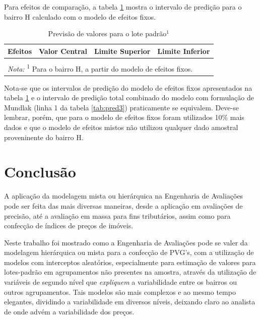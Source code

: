 \documentclass[
  a4paper, 11pt]{article}
\begin{document}
Para efeitos de comparação, a tabela \ref{tab:pred4} mostra o intervalo
de predição para o bairro H calculado com o modelo de efeitos fixos.

\begin{table}[H]

\caption{\label{tab:pred4}Previsão de valores para o lote padrão$^1$}
\centering
\begin{tabular}[t]{lrrr}
\toprule
Efeitos & Valor Central & Limite Superior & Limite Inferior\\
\midrule
\cellcolor{gray!6}{Fixos} & \cellcolor{gray!6}{5.728,11} & \cellcolor{gray!6}{5.869,19} & \cellcolor{gray!6}{5.587,03}\\
\bottomrule
\multicolumn{4}{l}{\rule{0pt}{1em}\textit{Nota: } \textsuperscript{1} Para o bairro H, a partir do modelo de efeitos fixos.}\\
\end{tabular}
\end{table}

Nota-se que os intervalos de predição do modelo de efeitos fixos
apresentados na tabela \ref{tab:pred4} e o intervalo de predição total
combinado do modelo com formulação de Mundlak (linha 1 da tabela
\ref{tab:pred3}) praticamente se equivalem. Deve-se lembrar, porém, que
para o modelo de efeitos fixos foram utilizados 10\% mais dados e que o
modelo de efeitos mistos não utilizou qualquer dado amostral
proveninente do bairro H.

\hypertarget{conclusuxe3o}{%
\section{Conclusão}\label{conclusuxe3o}}

A aplicação da modelagem mista ou hierárquica na Engenharia de
Avaliações pode ser feita das mais diversas maneiras, desde a aplicação
em avaliações de precisão, até a avaliação em massa para fins
tributários, assim como para confecção de índices de preços de imóveis.

Neste trabalho foi mostrado como a Engenharia de Avaliações pode se
valer da modelagem hierárquica ou mista para a confecção de PVG's, com a
utilização de modelos com interceptos aleatórios, especialmente para
estimação de valores para lotes-padrão em agrupamentos não presentes na
amostra, através da utilização de variáveis de segundo nível que
\emph{expliquem} a variabilidade entre os bairros ou outros
agrupamentos. Tais modelos são mais complexos e ao mesmo tempo
elegantes, dividindo a variabilidade em diversos níveis, deixando claro
ao analista de onde advém a variabilidade dos preços.
\end{document}
